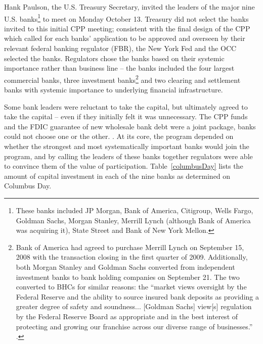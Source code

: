 \documentclass[12pt]{article}
\begin{document}
Hank Paulson, the U.S. Treasury Secretary, invited the leaders of the major nine U.S. banks\footnote{These banks included JP Morgan, Bank of America, Citigroup, Wells Fargo, Goldman Sachs, Morgan Stanley, Merrill Lynch (although Bank of America was acquiring it), State Street and Bank of New York Mellon.} to meet on Monday October 13. Treasury did not select the banks invited to this initial CPP meeting; consistent with the final design of the CPP which called for each banks' application to be approved and overseen by their relevant federal banking regulator (FBR), the New York Fed and the OCC selected the banks. Regulators chose the banks based on their systemic importance rather than business line -- the banks included the four largest commercial banks, three investment banks\footnote{Bank of America had agreed to purchase Merrill Lynch on September 15, 2008 with the transaction closing in the first quarter of 2009. Additionally, both Morgan Stanley and Goldman Sachs converted from independent investment banks to bank holding companies on September 21. The two converted to BHCs for similar reasons: the ``market views oversight by the Federal Reserve and the ability to source insured bank deposits as providing a greater degree of safety and soundness... [Goldman Sachs] view[s] regulation by the Federal Reserve Board as appropriate and in the best interest of protecting and growing our franchise across our diverse range of businesses.'' \citep{GSBHC}.} and two clearing and settlement banks with systemic importance to underlying financial infrastructure. 

Some bank leaders were reluctant to take the capital, but ultimately agreed to take the capital -- even if they initially felt it was unnecessary. The CPP funds and the FDIC guarantee of new wholesale bank debt were a joint package, banks could not choose one or the other. \citep{Geithner}. At its core, the program depended on whether the strongest and most systematically important banks would join the program, and by calling the leaders of these banks together regulators were able to convince them of the value of participation. Table~\ref{columbusDay} lists the amount of capital investment in each of the nine banks as determined on Columbus Day. 
\end{document}
